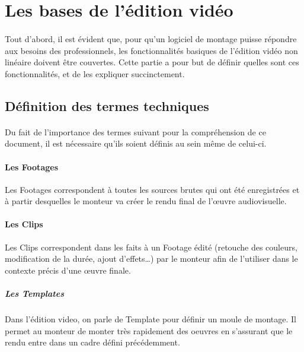 \newpage

\section{Les bases de l'édition vidéo}

\paragraph{}

Tout d'abord, il est évident que, pour qu'un logiciel de montage
puisse répondre aux besoins des professionnels, les fonctionnalités
basiques de l'édition vidéo non linéaire doivent être couvertes.
Cette partie a pour but de définir quelles sont ces fonctionnalités,
et de les expliquer succinctement.

\subsection{Définition des termes techniques}

\paragraph {}

Du fait de l'importance des termes suivant pour la compréhension de
ce document, il est nécessaire qu'ils soient définis au sein même
de celui-ci.

\paragraph{Les Footages}

Les Footages correspondent à toutes les sources brutes qui ont été
enregistrées et à partir desquelles le monteur va créer le rendu
final de l'œuvre audiovisuelle.

\paragraph{Les Clips}

Les Clips correspondent dans les faits à un Footage édité (retouche
des couleurs, modification de la durée, ajout d'effets\ldots) par le
monteur afin de l'utiliser dans le contexte précis d'une œuvre finale.

\subparagraph{Les Templates}

Dans l'édition video, on parle de Template pour définir un moule de
montage. Il permet au monteur de monter très rapidement des oeuvres en
s'assurant que le rendu entre dans un cadre défini précédemment.

